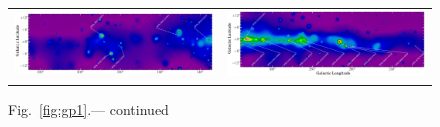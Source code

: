 {\begin{figure}[!ht]
    \begin{center}
        \begin{tabular}{ll}
                    \includegraphics[angle=90,scale=.3]{Figures/Galactic_plane_CAR_3of4_sqrt_spectral_2FHL.eps}&
                    \includegraphics[angle=90,scale=.3]{Figures/Galactic_plane_CAR_4of4_sqrt_spectral_2FHL.eps}\\
            
        \end{tabular}
    \end{center}
    \begin{flushleft}
        {Fig.~\ref{fig:gp1}.}---  continued
    \end{flushleft}
\end{figure}

}
